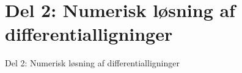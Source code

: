 \section{Del 2: Numerisk løsning af differentialligninger}
\begin{frame}
\centering
\Huge
Del 2: Numerisk løsning af differentialligninger
\end{frame}
%






